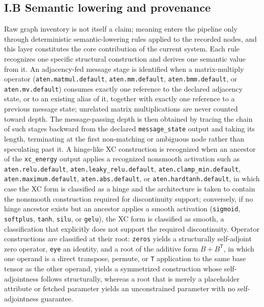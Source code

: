 \usepackage{amssymb}
\usepackage{pifont}

\subsection*{I.B Semantic lowering and provenance}

Raw graph inventory is not itself a claim; meaning enters the pipeline only through deterministic semantic-lowering rules applied to the recorded nodes, and this layer constitutes the core contribution of the current system. Each rule recognizes one specific structural construction and derives one semantic value from it. An adjacency-fed message stage is identified when a matrix-multiply operator (\texttt{aten.matmul.default}, \texttt{aten.mm.default}, \texttt{aten.bmm.default}, or \texttt{aten.mv.default}) consumes exactly one reference to the declared adjacency state, or to an existing alias of it, together with exactly one reference to a previous message state; unrelated matrix multiplications are never counted toward depth. The message-passing depth is then obtained by tracing the chain of such stages backward from the declared \texttt{message\_state} output and taking its length, terminating at the first non-matching or ambiguous node rather than speculating past it. A hinge-like XC construction is recognized when an ancestor of the \texttt{xc\_energy} output applies a recognized nonsmooth activation such as \texttt{aten.relu.default}, \texttt{aten.leaky\_relu.default}, \texttt{aten.clamp\_min.default}, \texttt{aten.maximum.default}, \texttt{aten.abs.default}, or \texttt{aten.hardtanh.default}, in which case the XC form is classified as a hinge and the architecture is taken to contain the nonsmooth construction required for discontinuity support; conversely, if no hinge ancestor exists but an ancestor applies a smooth activation (\texttt{sigmoid}, \texttt{softplus}, \texttt{tanh}, \texttt{silu}, or \texttt{gelu}), the XC form is classified as smooth, a classification that explicitly does not support the required discontinuity. Operator constructions are classified at their root: \texttt{zeros} yields a structurally self-adjoint zero operator, \texttt{eye} an identity, and a root of the additive form $B + B^{\mathsf{T}}$, in which one operand is a direct transpose, permute, or \texttt{T} application to the same base tensor as the other operand, yields a symmetrized construction whose self-adjointness follows structurally, whereas a root that is merely a placeholder attribute or fetched parameter yields an unconstrained parameter with no self-adjointness guarantee.

